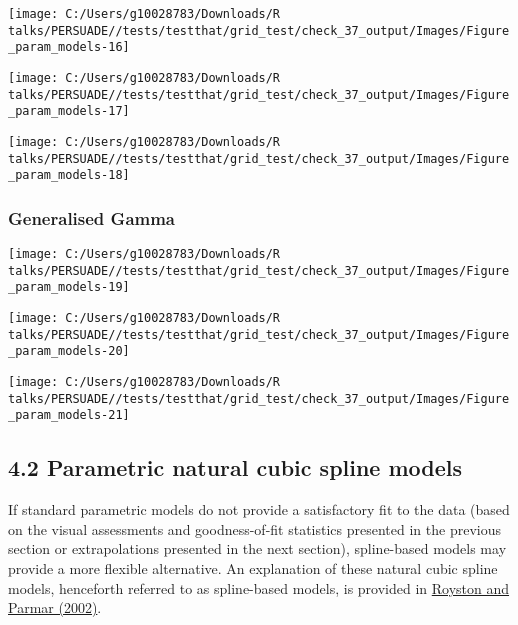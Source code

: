 \documentclass[
]{article}
\begin{document}
\begin{flushleft}\texttt{[image: C:/Users/g10028783/Downloads/R talks/PERSUADE//tests/testthat/grid\_test/check\_37\_output/Images/Figure\_param\_models-16]} \end{flushleft}

\begin{flushleft}\texttt{[image: C:/Users/g10028783/Downloads/R talks/PERSUADE//tests/testthat/grid\_test/check\_37\_output/Images/Figure\_param\_models-17]} \end{flushleft}

\begin{flushleft}\texttt{[image: C:/Users/g10028783/Downloads/R talks/PERSUADE//tests/testthat/grid\_test/check\_37\_output/Images/Figure\_param\_models-18]} \end{flushleft}

\clearpage

\subsubsection{Generalised Gamma}\label{generalised-gamma}

\begin{flushleft}\texttt{[image: C:/Users/g10028783/Downloads/R talks/PERSUADE//tests/testthat/grid\_test/check\_37\_output/Images/Figure\_param\_models-19]} \end{flushleft}

\begin{flushleft}\texttt{[image: C:/Users/g10028783/Downloads/R talks/PERSUADE//tests/testthat/grid\_test/check\_37\_output/Images/Figure\_param\_models-20]} \end{flushleft}

\begin{flushleft}\texttt{[image: C:/Users/g10028783/Downloads/R talks/PERSUADE//tests/testthat/grid\_test/check\_37\_output/Images/Figure\_param\_models-21]} \end{flushleft}

\clearpage

\subsection{4.2 Parametric natural cubic spline
models}\label{parametric-natural-cubic-spline-models}

If standard parametric models do not provide a satisfactory fit to the
data (based on the visual assessments and goodness-of-fit statistics
presented in the previous section or extrapolations presented in the
next section), spline-based models may provide a more flexible
alternative. An explanation of these natural cubic spline models,
henceforth referred to as spline-based models, is provided in
\href{https://doi.org/10.1002/sim.1203}{Royston and Parmar (2002)}.
\end{document}
